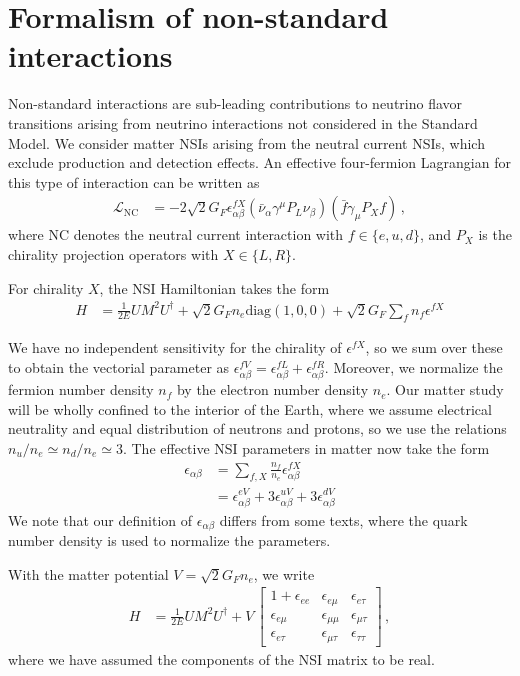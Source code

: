 \documentclass[draft=True]{revtex4-2}
\begin{document}
\section{Formalism of non-standard interactions}
Non-standard interactions are sub-leading contributions to neutrino flavor transitions arising from neutrino interactions not considered in the Standard Model.
We consider matter NSIs arising from the neutral current NSIs, which exclude production 
and detection effects. An effective four-fermion Lagrangian for this type of interaction can be written as
\begin{align}
   \mathcal{L}_{\mathrm{NC}} &= -2 \sqrt{2} G_{F} \epsilon_{\alpha \beta}^{f X}\left(\bar{\nu}_{\alpha} \gamma^{\mu} P_{L} \nu_{\beta}\right)\left(\bar{f} \gamma_{\mu} P_{X} f\right)\,,
\end{align}
where NC denotes the neutral current interaction with 
$f \in \{e,u,d\}$, and $P_X$ is the chirality projection operators with $X \in \{L,R\}$.  

For chirality $X$, the NSI Hamiltonian takes the form 
\begin{align}
   H &= \frac{1}{2E} UM^2U^\dagger + \sqrt{2}G_F n_e \text{diag}(1,0,0) + \sqrt{2}G_F \sum_f n_f \epsilon^{fX}
\end{align}

We have no independent sensitivity for the chirality of $\epsilon^{fX}$, so we sum over these to obtain the vectorial parameter as $\epsilon^{fV}_{\alpha\beta} = \epsilon^{fL}_{\alpha\beta}+ \epsilon^{fR}_{\alpha\beta}$.
Moreover, we normalize the fermion number density $n_f$ by
the electron number density $n_e$. Our matter study will be wholly confined to the interior of the Earth, where we assume electrical neutrality and equal distribution of neutrons and protons, 
so we use the relations $n_u/n_e \simeq n_d/n_e \simeq 3$.
The effective NSI parameters in matter now take the form
\begin{align} \label{eq:epsilon}
    \epsilon_{\alpha\beta} &= \sum_{f,X} \frac{n_f}{n_e} \epsilon^{fX}_{\alpha\beta} \nonumber \\
                           &= \epsilon_{\alpha\beta}^{eV} + 3\epsilon_{\alpha\beta}^{uV} + 3\epsilon_{\alpha\beta}^{dV}
\end{align}
We note that our definition of $\epsilon_{\alpha\beta}$ differs from some texts, where the quark number density is used to normalize
the parameters\cite{deepcoreNSI}.

With the matter potential $V = \sqrt{2}G_F n_e$, we write
\begin{align} \label{eq:H_NSI}
   H &= \frac{1}{2E} UM^2U^\dagger + V\,
   \begin{bmatrix}
      1 + \epsilon_{ee} & \epsilon_{e\mu} & \epsilon_{e\tau}  \\
      \epsilon_{e\mu} & \epsilon_{\mu\mu} & \epsilon_{\mu\tau}  \\
      \epsilon_{e \tau} & \epsilon_{\mu\tau} & \epsilon_{\tau\tau}
  \end{bmatrix}\,,
\end{align}
where we have assumed the components of the NSI matrix to be real. 
\end{document}
